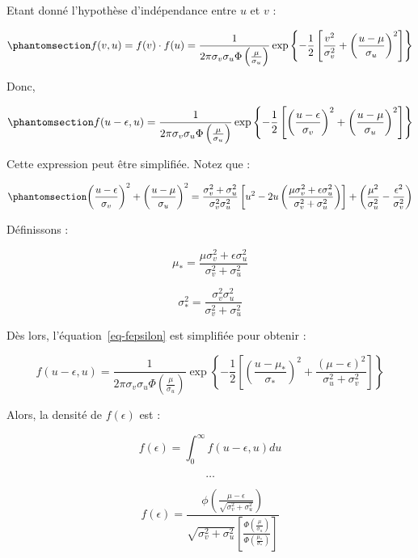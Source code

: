 \documentclass[
  12pt,
]{report}
\begin{document}
Etant donné l'hypothèse d'indépendance entre \(u\) et \(v\) :

\begin{equation}\phantomsection\label{eq-fv-fu}{
f(v,u) = f(v) \cdot f(u) = \frac{1}{2\pi\sigma_v\sigma_u\Phi\left(\frac{\mu}{\sigma_u}\right)}\exp\left\{-\frac{1}{2}\left[\frac{v^2}{\sigma^2_v} + \left(\frac{u-\mu}{\sigma_u}\right)^2\right] \right\}
}\end{equation}

Donc,

\begin{equation}\phantomsection\label{eq-fepsilon}{
f(u-\epsilon, u) = \frac{1}{2\pi\sigma_v\sigma_u\Phi\left(\frac{\mu}{\sigma_u}\right)}\exp\left\{-\frac{1}{2}\left[\left(\frac{u-\epsilon}{\sigma_v}\right)^2 + \left(\frac{u-\mu}{\sigma_u}\right)^2\right] \right\}
}\end{equation}

Cette expression peut être simplifiée. Notez que :

\begin{equation}\phantomsection\label{eq-fepsilon-2}{
\left(\frac{u-\epsilon}{\sigma_v}\right)^2 + \left(\frac{u-\mu}{\sigma_u}\right)^2 = \frac{\sigma^2_v + \sigma^2_u}{\sigma^2_v\sigma^2_u}\left[u^2 - 2u \left( \frac{\mu\sigma^2_v+\epsilon\sigma^2_u}{\sigma^2_v+\sigma^2_u}\right)\right] + \left(\frac{\mu^2}{\sigma^2_u}-\frac{\epsilon^2}{\sigma^2_v}\right)
}\end{equation}

Définissons :

\[
\mu_* = \frac{\mu\sigma^2_v+\epsilon\sigma^2_u}{\sigma^2_v+\sigma^2_u}
\]

\[
\sigma^2_* = \frac{\sigma^2_v\sigma^2_u}{\sigma^2_v + \sigma^2_u}
\]

Dès lors, l'équation~\ref{eq-fepsilon} est simplifiée pour obtenir :

\[
f(u-\epsilon, u) = \frac{1}{2\pi\sigma_v\sigma_u\Phi\left(\frac{\mu}{\sigma_u}\right)}\exp\left\{-\frac{1}{2}\left[\left(\frac{u-\mu_*}{\sigma_*}\right)^2+\frac{\left(\mu - \epsilon\right)^2}{\sigma^2_u+\sigma^2_v}\right]\right\}
\]

Alors, la densité de \(f(\epsilon)\) est :

\[
f(\epsilon) = \int_0^{\infty}f(u-\epsilon, u)du
\]

\[
\dots
\]

\[
f(\epsilon) = \frac{\phi\left(\frac{\mu - \epsilon}{\sqrt{\sigma^2_v+\sigma^2_u}}\right)}{\sqrt{\sigma^2_v+\sigma^2_u}\left[\frac{\Phi\left(\frac{\mu}{\sigma_u}\right)}{\Phi\left(\frac{\mu_*}{\sigma_*}\right)}\right]}
\]
\end{document}
